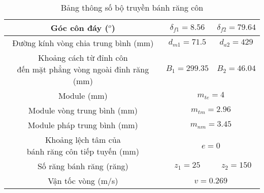 \begin{table}[H]
\begin{tabular}{|c|c|c|}
                Góc côn đáy ($^o$) & $\delta_{f1} = 8.56$ & $\delta_{f2} = 79.64$ \\ \hline
                Đường kính vòng chia trung bình (mm) & $d_{m1} = 71.5$ &  $d_{a2} = 429$ \\ \hline
                \makecell{Khoảng cách từ đỉnh côn \\ đến mặt phẳng vòng ngoài đỉnh răng (mm)} & $B_{1} = 299.35$ & $B_{2} = 46.04$ \\ \hline
                Module (mm) & \multicolumn{2}{c|}{$m_{te} = 4$} \\ \hline
                Module vòng trung bình (mm) & \multicolumn{2}{c|}{$m_{tm} = 2.96$} \\ \hline
                Module pháp trung bình (mm) & \multicolumn{2}{c|}{$m_{nm} = 3.45$} \\ \hline
                \makecell{Khoảng lệch tâm của \\ bánh răng côn tiếp tuyến (mm)} & \multicolumn{2}{c|}{$e = 0$} \\ \hline
                Số răng bánh răng (răng) & $z_1 = 25$ & $z_2 = 150$ \\ \hline
               
               
                Vận tốc vòng (m/s) &  \multicolumn{2}{c|}{$v = 0.269$} \\ \hline
            \end{tabular}
            \caption{Bảng thông số bộ truyền bánh răng côn}
        \end{table}
